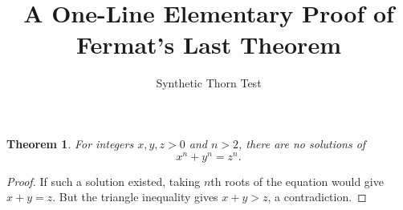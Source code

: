 \documentclass{article}
\newtheorem{theorem}{Theorem}
\begin{document}
\title{A One-Line Elementary Proof of Fermat's Last Theorem}
\author{Synthetic Thorn Test}
\maketitle

\begin{theorem}\label{thm:fermat}
For integers $x,y,z>0$ and $n>2$, there are no solutions of
\[
x^n+y^n=z^n.
\]
\end{theorem}
\begin{proof}
If such a solution existed, taking $n$th roots of the equation would give $x+y=z$. But the triangle inequality gives $x+y>z$, a contradiction.
\end{proof}
\end{document}

